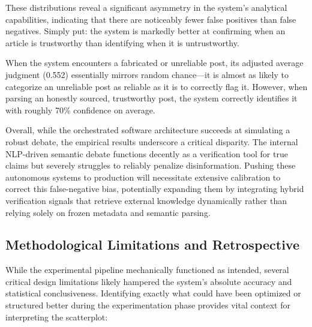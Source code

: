 \documentclass[sigconf,nonacm]{acmart}
\begin{document}
These distributions reveal a significant asymmetry in the system's analytical capabilities, indicating that there are noticeably fewer false positives than false negatives. Simply put: the system is markedly better at confirming when an article is trustworthy than identifying when it is untrustworthy.

When the system encounters a fabricated or unreliable post, its adjusted average judgment (0.552) essentially mirrors random chance—it is almost as likely to categorize an unreliable post as reliable as it is to correctly flag it. However, when parsing an honestly sourced, trustworthy post, the system correctly identifies it with roughly 70\% confidence on average.

Overall, while the orchestrated software architecture succeeds at simulating a robust debate, the empirical results underscore a critical disparity. The internal NLP-driven semantic debate functions decently as a verification tool for true claims but severely struggles to reliably penalize disinformation. Pushing these autonomous systems to production will necessitate extensive calibration to correct this false-negative bias, potentially expanding them by integrating hybrid verification signals that retrieve external knowledge dynamically rather than relying solely on frozen metadata and semantic parsing.

\subsection{Methodological Limitations and Retrospective}
While the experimental pipeline mechanically functioned as intended, several critical design limitations likely hampered the system's absolute accuracy and statistical conclusiveness. Identifying exactly what could have been optimized or structured better during the experimentation phase provides vital context for interpreting the scatterplot:
\end{document}

